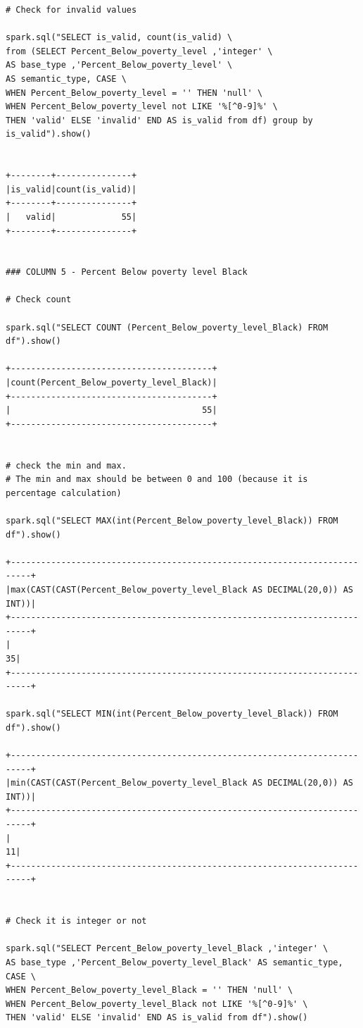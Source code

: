 \documentclass{article}
\begin{document}
\begin{verbatim}
# Check for invalid values

spark.sql("SELECT is_valid, count(is_valid) \  
from (SELECT Percent_Below_poverty_level ,'integer' \  
AS base_type ,'Percent_Below_poverty_level' \  
AS semantic_type, CASE \  
WHEN Percent_Below_poverty_level = '' THEN 'null' \  
WHEN Percent_Below_poverty_level not LIKE '%[^0-9]%' \  
THEN 'valid' ELSE 'invalid' END AS is_valid from df) group by is_valid").show()


+--------+---------------+
|is_valid|count(is_valid)|
+--------+---------------+
|   valid|             55|
+--------+---------------+


### COLUMN 5 - Percent Below poverty level Black

# Check count

spark.sql("SELECT COUNT (Percent_Below_poverty_level_Black) FROM df").show()

+----------------------------------------+
|count(Percent_Below_poverty_level_Black)|
+----------------------------------------+
|                                      55|
+----------------------------------------+


# check the min and max. 
# The min and max should be between 0 and 100 (because it is percentage calculation)

spark.sql("SELECT MAX(int(Percent_Below_poverty_level_Black)) FROM df").show()

+--------------------------------------------------------------------------+
|max(CAST(CAST(Percent_Below_poverty_level_Black AS DECIMAL(20,0)) AS INT))|
+--------------------------------------------------------------------------+
|                                                                        35|
+--------------------------------------------------------------------------+

spark.sql("SELECT MIN(int(Percent_Below_poverty_level_Black)) FROM df").show()

+--------------------------------------------------------------------------+
|min(CAST(CAST(Percent_Below_poverty_level_Black AS DECIMAL(20,0)) AS INT))|
+--------------------------------------------------------------------------+
|                                                                        11|
+--------------------------------------------------------------------------+


# Check it is integer or not

spark.sql("SELECT Percent_Below_poverty_level_Black ,'integer' \  
AS base_type ,'Percent_Below_poverty_level_Black' AS semantic_type, CASE \  
WHEN Percent_Below_poverty_level_Black = '' THEN 'null' \  
WHEN Percent_Below_poverty_level_Black not LIKE '%[^0-9]%' \  
THEN 'valid' ELSE 'invalid' END AS is_valid from df").show()


\end{verbatim}
\end{document}
